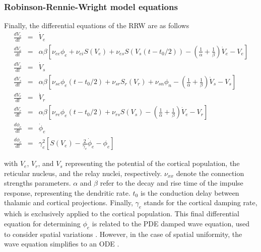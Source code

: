 \documentclass[12pt,twoside]{article}
\begin{document}
\subsubsection*{Robinson-Rennie-Wright model equations}

Finally, the differential equations of the RRW are as follows
\vspace{-0.3cm}
\begin{eqnarray}
    \frac{dV_{e}}{dt} &=& \dot{V}_{e}\\
    \frac{d\dot{V}_{e}}{dt} &=& \alpha \beta[\nu_{ee}\phi_{e} + \nu_{ei}S(V_{e}) + \nu_{es}S(V_{s}(t-t_{0}/2)) - (\frac{1}{\alpha}+\frac{1}{\beta})\dot{V}_{e} - V_{e}]\\
    \frac{dV_{s}}{dt} &=& \dot{V}_{s}\\
    \frac{d\dot{V}_{s}}{dt} &=& \alpha \beta[\nu_{se}\phi_{e}(t-t_{0}/2) + \nu_{sr}S_{r}(V_{r}) + \nu_{sn}\phi_{n} - (\frac{1}{\alpha}+\frac{1}{\beta})\dot{V}_{s} - V_{s}]\\
    \frac{dV_{r}}{dt} &=& \dot{V}_{r}\\
    \frac{d\dot{V}_{r}}{dt} &=& \alpha \beta[\nu_{re}\phi_{e}(t-t_{0}/2) + \nu_{rs}S(V_{s}) - (\frac{1}{\alpha}+\frac{1}{\beta})\dot{V}_{e} - V_{r}]\\
    \frac{d\phi_{e}}{dt} &=& \dot{\phi}_{e}\\
    \frac{d\dot{\phi}_{e}}{dt} &=& \gamma_{e}^{2}[S(V_{e}) - \frac{2}{\gamma_{e}}\dot{\phi}_{e}-\phi_{e}]
\end{eqnarray}

with $V_e$, $V_r$, and $V_s$ representing the potential of the cortical population, the reticular nucleus, and the relay nuclei, respectively. $\nu_{xx}$ denote the connection strengths parameters. $\alpha$ and $\beta$ refer to the decay and rise time of the impulse response, representing the  dendritic rate. $t_0$ is the conduction delay between thalamic and cortical projections. Finally, $\gamma_e$ stands for the cortical damping rate, which is exclusively applied to the cortical population. This final differential equation for determining $\phi_e$ is related to the PDE damped wave equation, used to consider spatial variations \citep{robinson1997propagation}. However, in the case of spatial uniformity, the wave equation simplifies to an ODE \citep{zhao2015generalized}.
\end{document}
